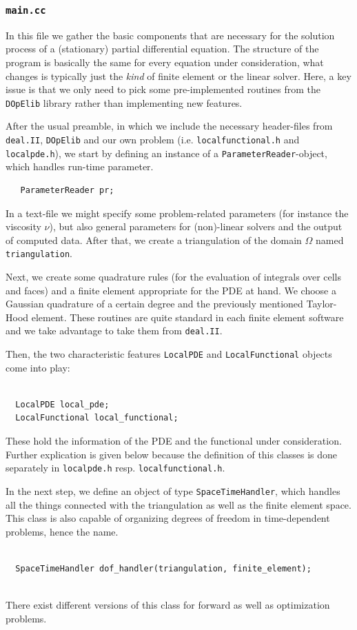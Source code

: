 \documentclass[prodmode,acmtoms]{acmsmall}
\numberwithin{equation}{section}
\newcommand{\deal}{\texttt{deal.II}}
\newcommand{\dope}{\texttt{DOpElib}}
\begin{document}
\subsubsection{\texttt{main.cc}}
In this file we gather the basic components that are necessary for the
solution process of a (stationary) partial differential equation. The
structure of the program is basically the same for every equation under
consideration, what changes is typically just the \textit{kind} of  finite
element or the linear solver. Here, a key issue is that we only need to pick 
some pre-implemented routines from the \dope{} library rather than 
implementing new features.


After the usual preamble, in which we include the necessary header-files from \deal{}, \dope{} and our own problem (i.e. \texttt{localfunctional.h} and \texttt{localpde.h}), we start by defining an instance of a \texttt{ParameterReader}-object, which handles run-time parameter.
\begin{lstlisting}
   ParameterReader pr;
\end{lstlisting}
In a text-file we might specify some problem-related parameters (for instance the viscosity $\nu$), but also general parameters for (non)-linear solvers and the output of computed data. 
After that, we create a triangulation of the domain $\Omega$ named \texttt{triangulation}.

Next, we create some quadrature rules (for the evaluation of integrals over
cells and faces) and a finite element appropriate for the PDE at hand. We
choose a Gaussian quadrature of a certain degree and the previously mentioned
Taylor-Hood element. These routines are quite standard in each finite element
software and we take advantage to take them from \deal{}.

Then, the two characteristic features \texttt{LocalPDE} and \texttt{LocalFunctional} objects come into play:
\begin{lstlisting}

  LocalPDE local_pde;
  LocalFunctional local_functional;

\end{lstlisting}
These hold the information of the PDE and the functional under consideration. Further explication is given below because
the definition of this classes is done separately in \texttt{localpde.h} resp.   \texttt{localfunctional.h}.

In the next step, we define an object of type \texttt{SpaceTimeHandler}, which handles all the things connected with the triangulation as well as the finite element space. This class is also capable of organizing degrees of freedom in time-dependent problems, hence the name. 
\begin{lstlisting}

  SpaceTimeHandler dof_handler(triangulation, finite_element);
  
\end{lstlisting}
There exist different versions of this class for forward as well as optimization problems. 
\end{document}
